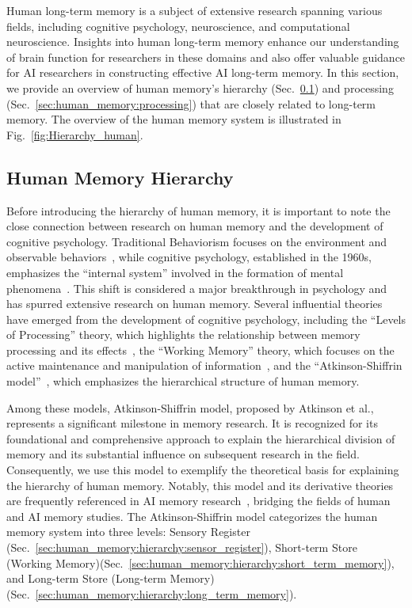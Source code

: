 \documentclass[journal,hideappendix]{vgtc}
\begin{document}
Human long-term memory is a subject of extensive research spanning various fields, including cognitive psychology, neuroscience, and computational neuroscience. Insights into human long-term memory enhance our understanding of brain function for researchers in these domains and also offer valuable guidance for AI researchers in constructing effective AI long-term memory. In this section, we provide an overview of human memory's hierarchy (Sec.~\ref{sec:human_memory:hierarchy}) and processing (Sec.~\ref{sec:human_memory:processing}) that are closely related to long-term memory. 
The overview of the human memory system is illustrated in Fig.~\ref{fig:Hierarchy_human}.

\subsection{Human Memory Hierarchy}
\label{sec:human_memory:hierarchy}
 
Before introducing the hierarchy of human memory, it is important to note the close connection between research on human memory and the development of cognitive psychology. 
Traditional Behaviorism focuses on the environment and observable behaviors~\cite{watson2017behaviorism}, while cognitive psychology, established in the 1960s, emphasizes the ``internal system'' involved in the formation of mental phenomena~\cite{neisser2014cognitive}. This shift is considered a major breakthrough in psychology and has spurred extensive research on human memory.
Several influential theories have emerged from the development of cognitive psychology, including the ``Levels of Processing'' theory, which highlights the relationship between memory processing and its effects~\cite{lockhart1990levels}, the ``Working Memory'' theory, which focuses on the active maintenance and manipulation of information~\cite{baddeley1974working}, and the ``Atkinson-Shiffrin model''~\cite{atkinson1968human}, which emphasizes the hierarchical structure of human memory.

Among these models, Atkinson-Shiffrin model, proposed by Atkinson et al., represents a significant milestone in memory research. It is recognized for its foundational and comprehensive approach to explain the hierarchical division of memory and its substantial influence on subsequent research in the field. 
Consequently, we use this model to exemplify the theoretical basis for explaining the hierarchy of human memory.
Notably, this model and its derivative theories are frequently referenced in AI memory research~\cite{lei2023recagent, cheng2022xmem, song2023moviechat}, bridging the fields of human and AI memory studies.
The Atkinson-Shiffrin model categorizes the human memory system into three levels: Sensory Register (Sec.~\ref{sec:human_memory:hierarchy:sensor_register}), Short-term Store (Working Memory)(Sec.~\ref{sec:human_memory:hierarchy:short_term_memory}), and Long-term Store (Long-term Memory) (Sec.~\ref{sec:human_memory:hierarchy:long_term_memory}).
\end{document}
